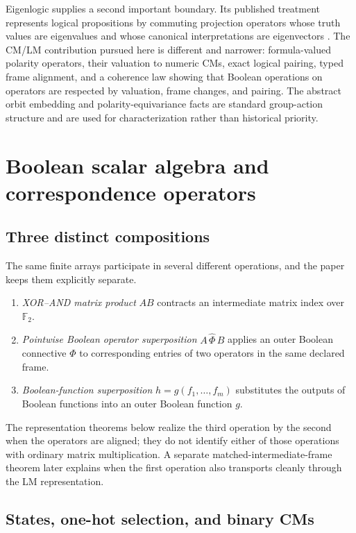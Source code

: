 \documentclass[11pt]{article}
\theoremstyle{definition}
\theoremstyle{remark}
\newcommand{\F}{\mathbb F}
\begin{document}
Eigenlogic supplies a second important boundary.  Its published treatment represents logical propositions by commuting projection operators whose truth values are eigenvalues and whose canonical interpretations are eigenvectors \cite{Toffano2020,DuboisToffano2016}.  The CM/LM contribution pursued here is different and narrower: formula-valued polarity operators, their valuation to numeric CMs, exact logical pairing, typed frame alignment, and a coherence law showing that Boolean operations on operators are respected by valuation, frame changes, and pairing.  The abstract orbit embedding and polarity-equivariance facts are standard group-action structure and are used for characterization rather than historical priority.

\section{Boolean scalar algebra and correspondence operators}
\label{sec:cm}

\subsection{Three distinct compositions}

The same finite arrays participate in several different operations, and the paper keeps them explicitly separate.
\begin{enumerate}
\item \emph{XOR--AND matrix product} $AB$ contracts an intermediate matrix index over $\F_2$.
\item \emph{Pointwise Boolean operator superposition} $A\,\widehat\Phi\,B$ applies an outer Boolean connective $\Phi$ to corresponding entries of two operators in the same declared frame.
\item \emph{Boolean-function superposition} $h=g(f_1,\ldots,f_m)$ substitutes the outputs of Boolean functions into an outer Boolean function $g$.
\end{enumerate}
The representation theorems below realize the third operation by the second when the operators are aligned; they do not identify either of those operations with ordinary matrix multiplication.  A separate matched-intermediate-frame theorem later explains when the first operation also transports cleanly through the LM representation.

\subsection{States, one-hot selection, and binary CMs}
\end{document}
